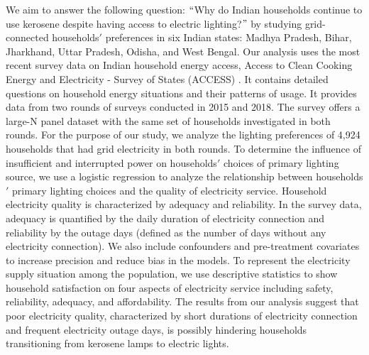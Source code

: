 \documentclass[11pt,english]{article}
\theoremstyle{plain} \newtheorem{claim}{Claim}
\theoremstyle{plain} \newtheorem{prop}{Proposition}
\theoremstyle{plain} \newtheorem{hypo}{Hypothesis}
\begin{document}
We aim to answer the following question: $``$Why do Indian households continue to use kerosene despite having access to electric lighting?$"$ by studying grid-connected households$'$ preferences in six Indian states: Madhya Pradesh, Bihar, Jharkhand, Uttar Pradesh, Odisha, and West Bengal. Our analysis uses the most recent survey data on Indian household energy access, Access to Clean Cooking Energy and Electricity - Survey of States (ACCESS) \citep{Aklinetal12016, Jainetal2018}. It contains detailed questions on household energy situations and their patterns of usage. It provides data from two rounds of surveys conducted in 2015 and 2018. The survey offers a large-N panel dataset with the same set of households investigated in both rounds. For the purpose of our study, we analyze the lighting preferences of 4,924 households that had grid electricity in both rounds. To determine the influence of insufficient and interrupted power on households$'$ choices of primary lighting source, we use a logistic regression to analyze the relationship between households$'$ primary lighting choices and the quality of electricity service. Household electricity quality is characterized by adequacy and reliability. In the survey data, adequacy is quantified by the daily duration of electricity connection and reliability by the outage days (defined as the number of days without any electricity connection). We also include confounders and pre-treatment covariates to increase precision and reduce bias in the models. To represent the electricity supply situation among the population, we use descriptive statistics to show household satisfaction on four aspects of electricity service including safety, reliability, adequacy, and affordability. The results from our analysis suggest that poor electricity quality, characterized by short durations of electricity connection and frequent electricity outage days, is possibly hindering households transitioning from kerosene lamps to electric lights.
\end{document}
